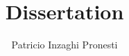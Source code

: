 \documentclass[11pt]{report}
\theoremstyle{plain}
\theoremstyle{definition}
\begin{document}
\title{Dissertation}
\author{Patricio Inzaghi Pronesti}
\maketitle

\begin{abstract}
    
\end{abstract}

\tableofcontents
















\printbibliography
\end{document}
